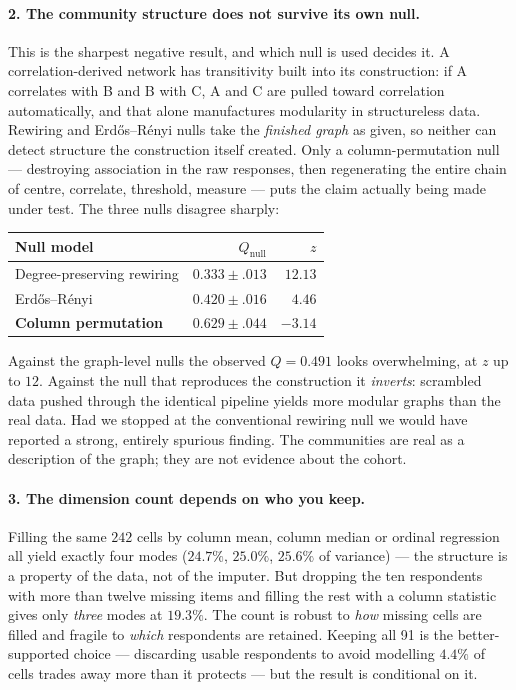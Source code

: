 \documentclass{article}
\begin{document}
\paragraph{2. The community structure does not survive its own null.}
This is the sharpest negative result, and which null is used decides it. A
correlation-derived network has transitivity built into its construction: if A
correlates with B and B with C, A and C are pulled toward correlation
automatically, and that alone manufactures modularity in structureless data.
Rewiring and Erd\H{o}s--R\'enyi nulls take the \emph{finished graph} as given,
so neither can detect structure the construction itself created. Only a
column-permutation null --- destroying association in the raw responses, then
regenerating the entire chain of centre, correlate, threshold, measure --- puts
the claim actually being made under test. The three nulls disagree sharply:

\begin{center}\footnotesize
\begin{tabular}{lrr}
\toprule
Null model & $Q_{\text{null}}$ & $z$ \\
\midrule
Degree-preserving rewiring & $0.333\pm.013$ & $12.13$ \\
Erd\H{o}s--R\'enyi & $0.420\pm.016$ & $4.46$ \\
\textbf{Column permutation} & $0.629\pm.044$ & $\mathbf{-3.14}$ \\
\bottomrule
\end{tabular}
\end{center}

\noindent
Against the graph-level nulls the observed $Q=0.491$ looks overwhelming, at $z$
up to $12$. Against the null that reproduces the construction it \emph{inverts}:
scrambled data pushed through the identical pipeline yields more modular graphs
than the real data. Had we stopped at the conventional rewiring null we would
have reported a strong, entirely spurious finding. The communities are real as
a description of the graph; they are not evidence about the cohort.

\paragraph{3. The dimension count depends on who you keep.}
Filling the same $242$ cells by column mean, column median or ordinal
regression all yield exactly four modes ($24.7\%$, $25.0\%$, $25.6\%$ of
variance) --- the structure is a property of the data, not of the imputer. But
dropping the ten respondents with more than twelve missing items and filling
the rest with a column statistic gives only \emph{three} modes at $19.3\%$. The
count is robust to \emph{how} missing cells are filled and fragile to
\emph{which} respondents are retained. Keeping all 91 is the better-supported
choice --- discarding usable respondents to avoid modelling $4.4\%$ of cells
trades away more than it protects --- but the result is conditional on it.
\end{document}
